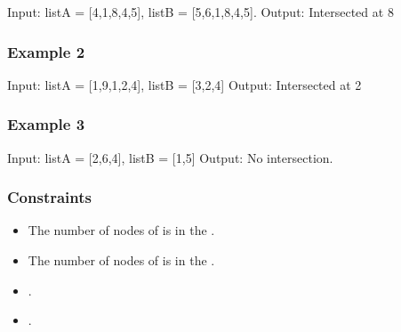 \documentclass[letterpaper,12pt,english]{book}
\begin{document}
\begin{sphinxVerbatim}[commandchars=\\\{\}]
Input: listA = [4,1,8,4,5], listB = [5,6,1,8,4,5].
Output: Intersected at \PYGZsq{}8\PYGZsq{}
\end{sphinxVerbatim}


\subsubsection{Example 2}
\label{\detokenize{Linked_List/02_LL_160_Intersection_of_Two_Linked_Lists:example-2}}
\sphinxAtStartPar
{}

\begin{sphinxVerbatim}[commandchars=\\\{\}]
Input: listA = [1,9,1,2,4], listB = [3,2,4]
Output: Intersected at \PYGZsq{}2\PYGZsq{}
\end{sphinxVerbatim}


\subsubsection{Example 3}
\label{\detokenize{Linked_List/02_LL_160_Intersection_of_Two_Linked_Lists:example-3}}
\sphinxAtStartPar
{}

\begin{sphinxVerbatim}[commandchars=\\\{\}]
Input: listA = [2,6,4], listB = [1,5]
Output: No intersection.
\end{sphinxVerbatim}


\subsubsection{Constraints}
\label{\detokenize{Linked_List/02_LL_160_Intersection_of_Two_Linked_Lists:constraints}}\begin{itemize}
\item {} 
\sphinxAtStartPar
The number of nodes of  is in the .

\item {} 
\sphinxAtStartPar
The number of nodes of  is in the .

\item {} 
\sphinxAtStartPar
{}.

\item {} 
\sphinxAtStartPar
{}.

\end{itemize}
\end{document}
